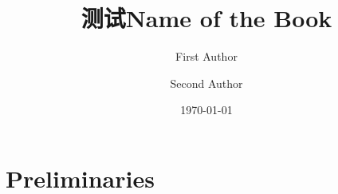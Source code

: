 \documentclass[openright, twoside, british]{book}
\title{测试Name of the Book}
\author{First Author \and Second Author}
\date{\today}
\begin{document}
\frontmatter



\maketitle\pagebreak











\tableofcontents

\mainmatter

\part{Preliminaries}



\appendix















\end{document}

